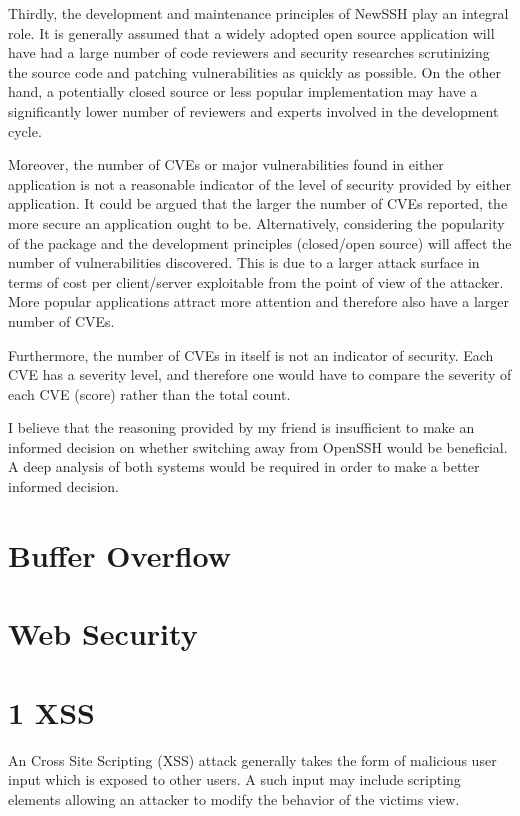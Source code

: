 \documentclass[a4paper, 12pt]{article}
\begin{document}
Thirdly, the development and maintenance principles of NewSSH play an integral role. It is generally assumed that a widely adopted open source application will have had a large number of code reviewers and security researches scrutinizing the source code and patching vulnerabilities as quickly as possible. On the other hand, a potentially closed source or less popular implementation may have a significantly lower number of reviewers and experts involved in the development cycle.

Moreover, the number of CVEs or major vulnerabilities found in either application is not a reasonable indicator of the level of security provided by either application. It could be argued that the larger the number of CVEs reported, the more secure an application ought to be. Alternatively, considering the popularity of the package and the development principles (closed/open source) will affect the number of vulnerabilities discovered. This is due to a larger attack surface in terms of cost per client/server exploitable from the point of view of the attacker. More popular applications attract more attention and therefore also have a larger number of CVEs.

Furthermore, the number of CVEs in itself is not an indicator of security. Each CVE has a severity level, and therefore one would have to compare the severity of each CVE (score) rather than the total count.

I believe that the reasoning provided by my friend is insufficient to make an informed decision on whether switching away from OpenSSH would be beneficial. A deep analysis of both systems would be required in order to make a better informed decision.

\newpage
\section*{Buffer Overflow}
\setcounter{section}{1}

\newpage
\section*{Web Security}
\setcounter{section}{1}

\section*{1 XSS}
An Cross Site Scripting (XSS) attack generally takes the form of malicious user input which is exposed to other users. A such input may include scripting elements allowing an attacker to modify the behavior of the victims view.
\end{document}
